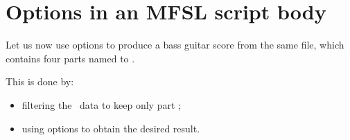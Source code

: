 \section{Options in an MFSL script body}

Let us now use options to produce a bass guitar score from the same  file, which contains four parts named  to .

This is done by:
\begin{itemize}
\item  filtering the \mxml\ data to keep only part ;
\item  using options to obtain the desired result.
\end{itemize}


